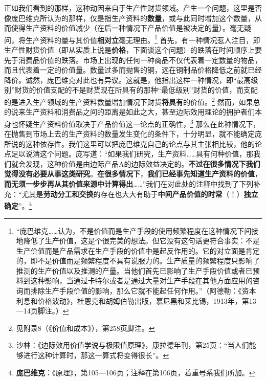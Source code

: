 \documentclass[fontset=fandol, a4paper, 12pt, openright]{ctexbook}
\begin{document}
正如我们看到的那样，这种动因来自于生产性财货领域。产生一个问题，这里是否像庞巴维克所认为的那样，仅是指生产资料的\textbf{数量}，或与此同时增加这个数量，从而使得生产资料的价值减少（在后一种情况下产品价值是被决定的量）。毫无疑问，将生产资料的量与其价值\textbf{相对立}毫无理由。\footnote{“庞巴维克……认为，不是价值而是生产手段的使用频繁程度在这种情况下间接地降低了生产价值，这是个很完美的想法。但它没有这句话更符合事实：不是生产价值而是产品需求在生产手段的价值中是起反作用的。它的对立面是肯定的，即不是价值而是频繁程度不具有说服力的。生产质量的频繁程度只影响了推测的生产价值以及推测的产量。当他们首先已影响了生产手段价值或者已预料到这种影响，当通过卡特尔或者是通过大量对生产手段在其他方面应用的咨询而排除生产手段价值的影响，那么它就不能起任何作用。”（阿德勒：《资本利息和价格波动》，杜恩克和胡姆伯勒出版，慕尼黑和莱比锡，1913年，第13—14页脚注。）} 首先，有一种情况惹人注目，即生产性财货价值（即从实质上说是\textbf{价格}，下面谈这个问题）的跌落在时间顺序上要先于消费品价值的跌落。市场上出现的任何一种商品不仅代表着一定数量的物品，而且代表着一定的价值量。数量过多而抛售的铜，远在铜制品价格降低之前就已经降价。诚然，庞巴维克对此也有异议。这就是，他指出这样一种情况，即“最高级别”财货的价值支配的不是财货现在所具有的那种“最低级别”财货的价值，而支配的是进入生产领域的生产资料数量增加情况下财货\textbf{将具有}的价值。\footnote{见附录8（《价值和成本》），第258页脚注。} 然而，如果总的说来生产资料和消费品之间的距离是如此之大，甚至边际效用理论的拥护者们本身也怀疑生产资料价值取决于产品价值这一论点的正确性，\footnote{沙林：《边际效用价值学说与极限值原理》，康拉德年刊，第25页：“当人们能够进行这种计算时，那这一算式将变得很长”。} 那么在此种情况下，在抛售到市场上去的生产资料的数量发生变化的条件下，十分明显，就不能确定庞所说的这种依存性。我们这里可以把庞巴维克自己的论点与其主张相比较，他的论点足以说清这个问题。庞写道：“如果我们研究，生产资料……具有何种价值，那我们就会发现，这种价值是由边际产品A的边际效益决定的。\textbf{不过在很多情况下我们觉得没有必要从事这类研究}。\textbf{在很多情况下}，\textbf{我们已经事先知道生产资料的价值}，\textbf{而无须一步步再从其价值来源中计算得出}……”我们在对此处的注释中找到了下列补充：“尤其是\textbf{劳动分工和交换}的存在也大大有助于\textbf{中间产品价值的时常}（！）\textbf{独立确定}”。\footnote{\textbf{庞巴维克}：《原理》，第105—106页；注释在第106页，着重号系我们所加。}
\end{document}
